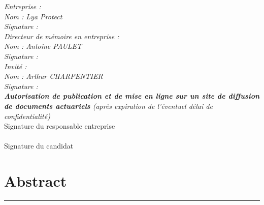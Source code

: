 \documentclass[
  a4paper,
  11pt,
  a4paper,
  twoside,
  openright]{report}
\renewcommand*\contentsname{Table of contents}
\newcommand\contentsname{Table of contents}
\begin{document}
\begin{titlepage}
\begin{minipage}[t]{0.53\textwidth}
\begin{tabular}[t]{@{}p{6.5cm} >{\raggedleft\arraybackslash}m{2cm}}
\end{tabular}
\end{minipage}%
\begin{minipage}[t]{0.47\textwidth}
\textit{Entreprise :} \\
\textit{Nom : Lya Protect} \\[0.3cm]
\textit{Signature :} \\[0.5cm]
\textit{Directeur de mémoire en entreprise :} \\
\textit{Nom : Antoine PAULET} \\[0.3cm]
\textit{Signature :} \\[0.5cm]
\textit{Invité :} \\
\textit{Nom : Arthur CHARPENTIER} \\[0.3cm]
\textit{Signature :} \\[0.5cm]
\textit{\textbf{Autorisation de publication et de mise en ligne sur un site de
diffusion de documents actuariels} (après expiration de l'éventuel délai de
confidentialité)}\\[0.2cm]
Signature du responsable entreprise \\
\framebox[7cm]{\rule{0mm}{1.5cm}} \\
Signature du candidat \\
\framebox[7cm]{\rule{0mm}{1.5cm}}
\end{minipage}

\end{titlepage}
\restoregeometry

\cleardoublepage
{}
\renewcommand*\contentsname{Table of Contents}
{
\setcounter{tocdepth}{1}
\tableofcontents
}


\chapter*{Abstract}\label{abstract}



\thispagestyle{empty}
\noindent\rule{\textwidth}{0.4pt}\\[0.4em]
\end{document}
